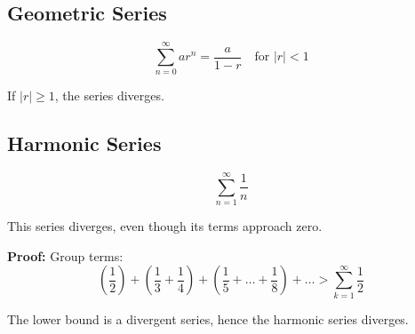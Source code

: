 \subsection{Geometric Series}

\[
\sum_{n=0}^\infty ar^n = \frac{a}{1 - r} \quad \text{for } |r| < 1
\]

If \(|r| \ge 1\), the series diverges.

\subsection{Harmonic Series}

\[
\sum_{n=1}^{\infty} \frac{1}{n}
\]

This series diverges, even though its terms approach zero.

\textbf{Proof:} Group terms:
\[
\left(\frac{1}{2}\right) + \left(\frac{1}{3} + \frac{1}{4}\right) + \left(\frac{1}{5} + \dots + \frac{1}{8}\right) + \dots > \sum_{k=1}^\infty \frac{1}{2}
\]

The lower bound is a divergent series, hence the harmonic series diverges.

\newpage